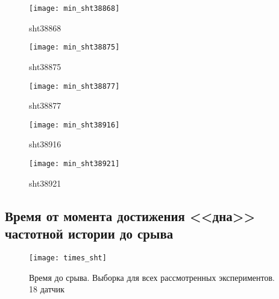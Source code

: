 \begin{figure}[H]
	\begin{minipage}[H]{0.49\linewidth}
		\begin{center}
			\texttt{[image: min\_sht38868]}
			\caption{sht38868}
		\end{center}
	\end{minipage}
	\hfill
	\begin{minipage}[H]{0.49\linewidth}
		\begin{center}
			\texttt{[image: min\_sht38875]}
			\caption{sht38875}
		\end{center}
	\end{minipage}	
\end{figure}

\begin{figure}[H]
	\begin{minipage}[H]{0.49\linewidth}
		\begin{center}
			\texttt{[image: min\_sht38877]}
			\caption{sht38877}
		\end{center}
	\end{minipage}
	\hfill
	\begin{minipage}[H]{0.49\linewidth}
		\begin{center}
			\texttt{[image: min\_sht38916]}
			\caption{sht38916}
		\end{center}
	\end{minipage}	
\end{figure}

\begin{figure}[H]
	\begin{center}
		\texttt{[image: min\_sht38921]}
		\caption{sht38921}
	\end{center}
\end{figure}

\subsection{Время от момента достижения <<дна>> частотной истории до срыва}

\begin{figure}[H]
	\begin{center}
		\texttt{[image: times\_sht]}
		\caption{Время до срыва. Выборка для всех рассмотренных экспериментов. 18 датчик}
	\end{center}
\end{figure}

